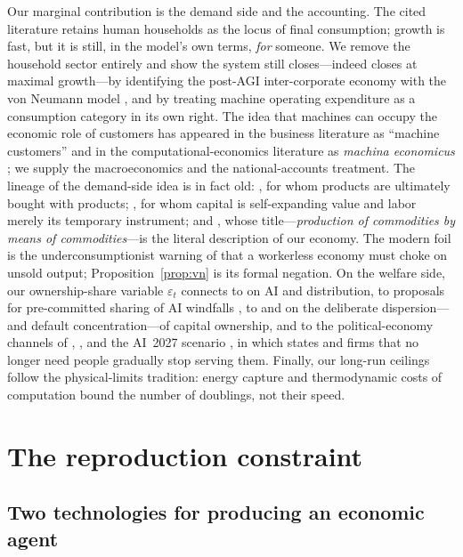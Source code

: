 \documentclass[11pt]{article}
\newcommand{\eps}{\varepsilon}
\begin{document}
Our marginal contribution is the demand side and the accounting. The cited literature retains human households as the locus of final consumption; growth is fast, but it is still, in the model's own terms, \emph{for} someone. We remove the household sector entirely and show the system still closes---indeed closes at maximal growth---by identifying the post-AGI inter-corporate economy with the von Neumann model \citep{vonneumann1945,dorfman1958}, and by treating machine operating expenditure as a consumption category in its own right. The idea that machines can occupy the economic role of customers has appeared in the business literature as ``machine customers'' \citep{scheibenreif2023} and in the computational-economics literature as \emph{machina economicus} \citep{parkes2015}; we supply the macroeconomics and the national-accounts treatment. The lineage of the demand-side idea is in fact old: \citet{say1803}, for whom products are ultimately bought with products; \citet{marx1867}, for whom capital is self-expanding value and labor merely its temporary instrument; and \citet{sraffa1960}, whose title---\emph{production of commodities by means of commodities}---is the literal description of our economy. The modern foil is the underconsumptionist warning of \citet{ford2015} that a workerless economy must choke on unsold output; Proposition~\ref{prop:vn} is its formal negation. On the welfare side, our ownership-share variable $\eps_t$ connects to \citet{korinek2019} on AI and distribution, to proposals for pre-committed sharing of AI windfalls \citep{okeefe2020}, to \citet{meade1964} and \citet{piketty2014} on the deliberate dispersion---and default concentration---of capital ownership, and to the political-economy channels of \citet{kulveit2025}, \citet{drago2025}, and the AI~2027 scenario \citep{kokotajlo2025}, in which states and firms that no longer need people gradually stop serving them. Finally, our long-run ceilings follow the physical-limits tradition: energy capture and thermodynamic costs of computation \citep{landauer1961} bound the number of doublings, not their speed.

\section{The reproduction constraint}\label{sec:bottleneck}

\subsection{Two technologies for producing an economic agent}
\end{document}
